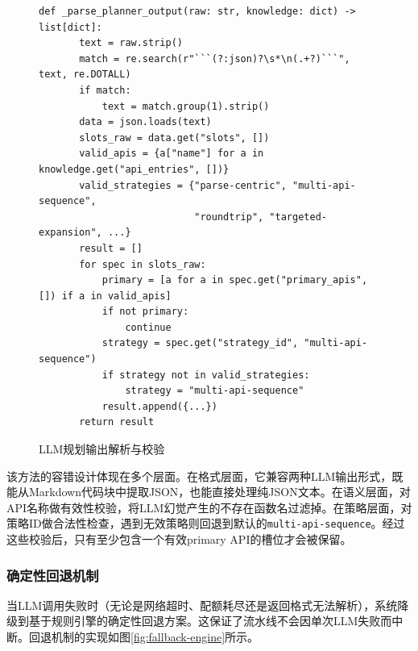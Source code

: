 \begin{figure}[H]
    \centering
    \begin{lstlisting}[style=style@python]
   def _parse_planner_output(raw: str, knowledge: dict) -> list[dict]:
       text = raw.strip()
       match = re.search(r"```(?:json)?\s*\n(.+?)```", text, re.DOTALL)
       if match:
           text = match.group(1).strip()
       data = json.loads(text)
       slots_raw = data.get("slots", [])
       valid_apis = {a["name"] for a in knowledge.get("api_entries", [])}
       valid_strategies = {"parse-centric", "multi-api-sequence",
                           "roundtrip", "targeted-expansion", ...}
       result = []
       for spec in slots_raw:
           primary = [a for a in spec.get("primary_apis", []) if a in valid_apis]
           if not primary:
               continue
           strategy = spec.get("strategy_id", "multi-api-sequence")
           if strategy not in valid_strategies:
               strategy = "multi-api-sequence"
           result.append({...})
       return result
    \end{lstlisting}
    \caption{LLM规划输出解析与校验}
    \label{fig:parse-planner}
\end{figure}

该方法的容错设计体现在多个层面。在格式层面，它兼容两种LLM输出形式，既能从Markdown代码块中提取JSON，也能直接处理纯JSON文本。在语义层面，对API名称做有效性校验，将LLM幻觉产生的不存在函数名过滤掉。在策略层面，对策略ID做合法性检查，遇到无效策略则回退到默认的\texttt{multi-api-sequence}。经过这些校验后，只有至少包含一个有效primary API的槽位才会被保留。

\subsubsection{确定性回退机制}

当LLM调用失败时（无论是网络超时、配额耗尽还是返回格式无法解析），系统降级到基于规则引擎的确定性回退方案。这保证了流水线不会因单次LLM失败而中断。回退机制的实现如图\ref{fig:fallback-engine}所示。

